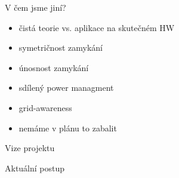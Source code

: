 \documentclass{beamer}
\begin{document}
\begin{frame}{V čem jsme jiní?}
    \begin{itemize}
        \item čistá teorie vs. aplikace na skutečném HW
        \item symetričnost zamykání
        \item únosnost zamykání
        \item sdílený power managment
        \item grid-awareness

        \pause

        \item nemáme v plánu to zabalit
    \end{itemize}
\end{frame}

\begin{frame}{Vize projektu}
\end{frame}

\begin{frame}{Aktuální postup}
\end{frame}
\end{document}
